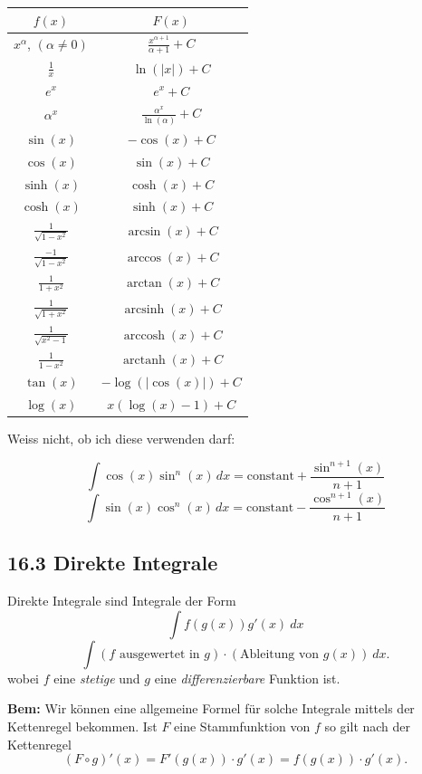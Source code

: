 \documentclass[a4paper,landscape,8pt]{extarticle}
\newcommand{\abs}[1]{\left\lvert #1 \right\rvert}
\newcommand{\Bem}{\textbf{Bem: }}
\DeclareMathOperator{\arcsinh}{arcsinh}
\DeclareMathOperator{\arccosh}{arccosh}
\DeclareMathOperator{\arctanh}{arctanh}
\begin{document}
\begin{multicols*}{4}
\begin{table}[H]
\centering
\begin{tabular}{|c|c|}
\toprule
$f(x)$ & $F(x)$ \\
\midrule
$x^\alpha$, $(\alpha\neq 0)$ & $\frac{x^{\alpha +1}}{\alpha +1}+C$
\\
$\frac{1}{x}$ & $\ln(\abs{x})+C$
\\
\hline
$e^x$ & $e^x + C$
\\
$\alpha^x$ & $\frac{\alpha^x}{\ln(\alpha)}+C$
\\
\hline
$\sin(x)$ & $-\cos(x)+C$
\\
$\cos(x)$ & $\sin(x)+C$
\\
\hline
$\sinh(x)$ & $\cosh(x) + C$
\\
$\cosh(x)$ & $\sinh(x) + C$
\\
\hline
$\frac{1}{\sqrt{1-x^2}}$ & $\arcsin(x)+C$
\\
$\frac{-1}{\sqrt{1-x^2}}$ & $\arccos(x)+C$
\\
$\frac{1}{1+x^2}$ & $\arctan(x)+C$
\\
\hline
$\frac{1}{\sqrt{1 + x^2}}$ & $\arcsinh(x)+C$
\\
$\frac{1}{\sqrt{x^2-1}}$ & $\arccosh(x)+C$
\\
$\frac{1}{1-x^2}$ & $\arctanh(x)+C$
\\
\hline
$\tan(x)$ & $-\log(\abs{\cos(x)})+C$\\
\hline
$\log(x)$ & $x(\log(x)-1)+C$\\
\bottomrule
\end{tabular}
\end{table}

Weiss nicht, ob ich diese verwenden darf:

\[\int \cos (x) \sin ^n(x) \, dx=\text{constant}+\frac{\sin ^{n+1}(x)}{n+1}\]
\[\int \sin (x) \cos ^n(x) \, dx=\text{constant}-\frac{\cos ^{n+1}(x)}{n+1}\]


\subsection{16.3 Direkte Integrale}

\Def Direkte Integrale sind Integrale der Form
\[
\int f(g(x))g'(x) \ dx
\]
\[
\int (f \text{ ausgewertet in } g) \cdot (\text{Ableitung von } g(x)) \ dx.
\]
wobei $f$ eine \emph{stetige} und $g$ eine \emph{differenzierbare} Funktion ist.

\Bem Wir können eine allgemeine Formel für solche Integrale mittels der
Kettenregel bekommen. Ist $F$ eine Stammfunktion von $f$ so gilt nach der Kettenregel
\[
(F\circ g)'(x) = F'(g(x))\cdot g'(x) = f(g(x))\cdot g'(x).
\]


\end{multicols*}
\end{document}
